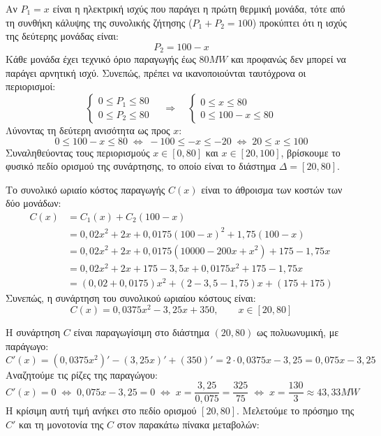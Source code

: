 \lysh\vspace{-5mm}
\begin{alist}
\item Αν $P_1=x$ είναι η ηλεκτρική ισχύς που παράγει η πρώτη θερμική μονάδα, τότε από τη συνθήκη κάλυψης της συνολικής ζήτησης ($P_1+P_2=100$) προκύπτει ότι η ισχύς της δεύτερης μονάδας είναι:
\[P_2=100-x\]
Κάθε μονάδα έχει τεχνικό όριο παραγωγής έως $80\si{MW}$ και προφανώς δεν μπορεί να παράγει αρνητική ισχύ. Συνεπώς, πρέπει να ικανοποιούνται ταυτόχρονα οι περιορισμοί:
\[
\begin{cases}
0 \le P_1 \le 80 \\
0 \le P_2 \le 80
\end{cases}
\quad\Rightarrow\quad
\begin{cases}
0 \le x \le 80 \\
0 \le 100-x \le 80
\end{cases}
\]
Λύνοντας τη δεύτερη ανισότητα ως προς $x$:
\[0 \le 100-x \le 80 \;\Leftrightarrow\; -100 \le -x \le -20 \;\Leftrightarrow\; 20 \le x \le 100\]
Συναληθεύοντας τους περιορισμούς $x \in [0,80]$ και $x \in [20,100]$, βρίσκουμε το φυσικό πεδίο ορισμού της συνάρτησης, το οποίο είναι το διάστημα $\varDelta = [20,80]$.

Το συνολικό ωριαίο κόστος παραγωγής $C(x)$ είναι το άθροισμα των κοστών των δύο μονάδων:
\begin{align*}
  C(x) &= C_1(x) + C_2(100-x) \\
       &= 0{,}02x^2 + 2x + 0{,}0175(100-x)^2 + 1{,}75(100-x) \\
       &= 0{,}02x^2 + 2x + 0{,}0175(10000 - 200x + x^2) + 175 - 1{,}75x \\
       &= 0{,}02x^2 + 2x + 175 - 3{,}5x + 0{,}0175x^2 + 175 - 1{,}75x \\
       &= (0{,}02 + 0{,}0175)x^2 + (2 - 3{,}5 - 1{,}75)x + (175 + 175)
\end{align*}
Συνεπώς, η συνάρτηση του συνολικού ωριαίου κόστους είναι:
\[C(x) = 0{,}0375x^2 - 3{,}25x + 350, \qquad x \in [20,80]\]

\item Η συνάρτηση $C$ είναι παραγωγίσιμη στο διάστημα $(20,80)$ ως πολυωνυμική, με παράγωγο:
\[C'(x) = (0{,}0375x^2)' - (3{,}25x)' + (350)' = 2 \cdot 0{,}0375x - 3{,}25 = 0{,}075x - 3{,}25\]
Αναζητούμε τις ρίζες της παραγώγου:
\[C'(x)=0 \;\Leftrightarrow\; 0{,}075x - 3{,}25 = 0 \;\Leftrightarrow\; x = \frac{3{,}25}{0{,}075} = \frac{325}{75} \;\Leftrightarrow\; x = \frac{130}{3} \approx 43{,}33\si{MW}\]
Η κρίσιμη αυτή τιμή ανήκει στο πεδίο ορισμού $[20,80]$. Μελετούμε το πρόσημο της $C'$ και τη μονοτονία της $C$ στον παρακάτω πίνακα μεταβολών:


\end{alist}
